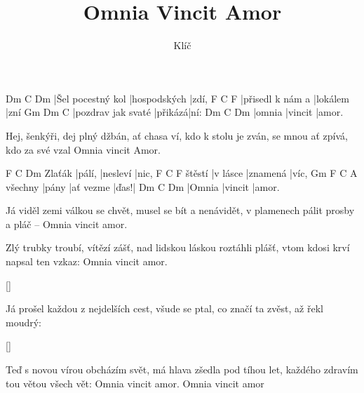 \documentclass{song}
\title{Omnia Vincit Amor}
\author{Klíč}
\begin{document}
\strophe
Dm                C            Dm
|Šel pocestný kol |hospodských |zdí,
F                C        F
|přisedl k nám a |lokálem |zní
Gm                 Dm      C
|pozdrav jak svaté |přikázá|ní:
Dm     C       Dm
|omnia |vincit |amor. 
\endstrophe

\strophe*
Hej, šenkýři, dej plný džbán,
ať chasa ví, kdo k stolu je zván,
se mnou ať zpívá, kdo za své vzal
Omnia vincit Amor.
\endstrophe

       F      C        Dm
Zlaťák |pálí, |nesleví |nic,
       F        C        F
štěstí |v lásce |znamená |víc,
        Gm    F         C    A
všechny |pány |ať vezme |ďas!|
Dm     C       Dm
|Omnia |vincit |amor.
\endstrophe

\strophe*
Já viděl zemi válkou se chvět,
musel se bít a nenávidět,
v plamenech pálit prosby a pláč --
Omnia vincit amor.
\endstrophe

\strophe*
Zlý trubky troubí, vítězí zášť,
nad lidskou láskou roztáhli plášť,
vtom kdosi krví napsal ten vzkaz:
Omnia vincit amor.
\endstrophe

\ref{}

\strophe*
Já prošel každou z nejdelších cest,
všude se ptal, co značí ta zvěst,
až řekl moudrý: 
\endstrophe

\ref{}

\strophe*
Teď s novou vírou obcházím svět,
má hlava zšedla pod tíhou let,
každého zdravím tou větou všech vět:
Omnia vincit amor.
Omnia vincit amor
\endstrophe
\end{document}
